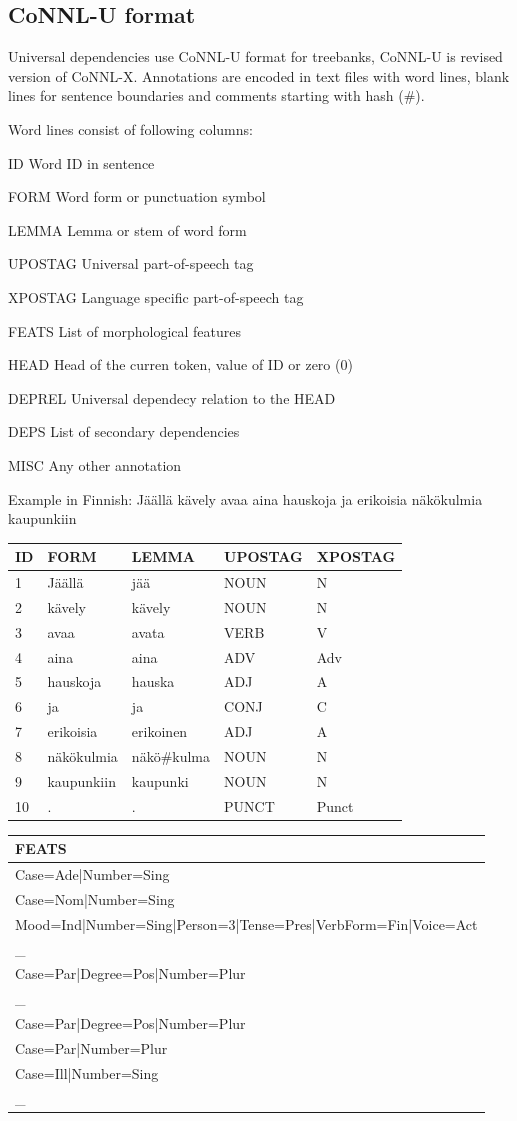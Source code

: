 \documentclass[12pt,a4paper,english
]{tutthesis}
\begin{document}
\subsection{CoNNL-U format}
Universal dependencies use CoNNL-U format for treebanks, CoNNL-U is revised version of CoNNL-X. Annotations are encoded in text files with word lines, blank lines for sentence boundaries and comments starting with hash (\#).

Word lines consist of following columns:
\begin{termlist}
\item[ID] Word ID in sentence
\item[FORM] Word form or punctuation symbol
\item[LEMMA] Lemma or stem of word form
\item[UPOSTAG] Universal part-of-speech tag
\item[XPOSTAG] Language specific part-of-speech tag
\item[FEATS] List of morphological features
\item[HEAD] Head of the curren token, value of ID or zero (0)
\item[DEPREL] Universal dependecy relation to the HEAD
\item[DEPS] List of secondary dependencies
\item[MISC] Any other annotation
\end{termlist}

Example in Finnish: Jäällä kävely avaa aina hauskoja ja erikoisia näkökulmia kaupunkiin

\begin{tabular}{l l l l l} 
ID & FORM & LEMMA & UPOSTAG & XPOSTAG \\
\hline
1 & Jäällä & jää & NOUN & N \\
2 & kävely & kävely & NOUN & N \\
3 & avaa & avata & VERB & V \\
4 & aina & aina & ADV & Adv \\
5 & hauskoja & hauska & ADJ & A \\
6 & ja & ja & CONJ & C \\
7 & erikoisia & erikoinen & ADJ & A \\
8 & näkökulmia & näkö\#kulma & NOUN & N \\
9 & kaupunkiin & kaupunki & NOUN & N \\
10 & . & . & PUNCT & Punct
\end{tabular}

\begin{tabular}{l}
FEATS \\
\hline
Case=Ade|Number=Sing \\
Case=Nom|Number=Sing \\
Mood=Ind|Number=Sing|Person=3|Tense=Pres|VerbForm=Fin|Voice=Act \\
\_ \\
Case=Par|Degree=Pos|Number=Plur \\
\_ \\
Case=Par|Degree=Pos|Number=Plur \\
Case=Par|Number=Plur \\
Case=Ill|Number=Sing \\
\_
\end{tabular}
\end{document}
